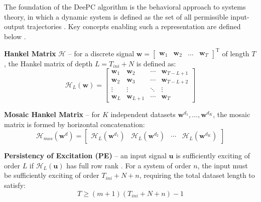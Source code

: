 The foundation of the DeePC algorithm is the behavioral approach to systems theory, in which a dynamic system is defined as the set of all permissible input-output trajectories \cite{WILLEMS2005325}. Key concepts enabling such a representation are defined below \cite{quad, ethzurich, markovsky2023data, deepc}.

\textbf{Hankel Matrix} $\mathcal{H}$ -- for a discrete signal $\boldsymbol{w} = \begin{bmatrix} \boldsymbol{w}_1 & \boldsymbol{w}_2 & \dots & \boldsymbol{w}_T \end{bmatrix}^\mathrm{T}$ of length $T$, the Hankel matrix of depth $L = T_{ini} + N$ is defined as:
\begin{equation}
    \label{eq:hankel_matrix}
    \mathcal{H}_L(\boldsymbol{w}) = 
    \begin{bmatrix}
        \boldsymbol{w}_1 & \boldsymbol{w}_2 & \cdots & \boldsymbol{w}_{T-L+1}\\
        \boldsymbol{w}_2 & \boldsymbol{w}_3 & \cdots & \boldsymbol{w}_{T-L+2}\\
        \vdots & \vdots & \ddots & \vdots\\
        \boldsymbol{w}_L & \boldsymbol{w}_{L+1} & \cdots & \boldsymbol{w}_T
    \end{bmatrix}
\end{equation}

\textbf{Mosaic Hankel Matrix} -- for $K$ independent datasets $\boldsymbol{w}^{d_{1}}, \dots, \boldsymbol{w}^{d_{K}}$, the mosaic matrix is formed by horizontal concatenation:
\begin{equation}
    \label{eq:mosaic_hankel}
    \mathcal{H}_{mos}(\boldsymbol{w}^d) = 
    \begin{bmatrix}
        \mathcal{H}_L(\boldsymbol{w}^{d_{1}}) & \mathcal{H}_L(\boldsymbol{w}^{d_{2}}) & \cdots & \mathcal{H}_L(\boldsymbol{w}^{d_{K}})
    \end{bmatrix}
\end{equation}

\textbf{Persistency of Excitation (PE)} -- an input signal $\boldsymbol{u}$ is sufficiently exciting of order $L$ if $\mathcal{H}_L(\boldsymbol{u})$ has full row rank \cite{ethzurich}. For a system of order $n$, the input must be sufficiently exciting of order $T_{ini} + N + n$, requiring the total dataset length to satisfy:
\begin{equation}
    T \ge (m+1)(T_{ini} + N + n) - 1
\end{equation}

